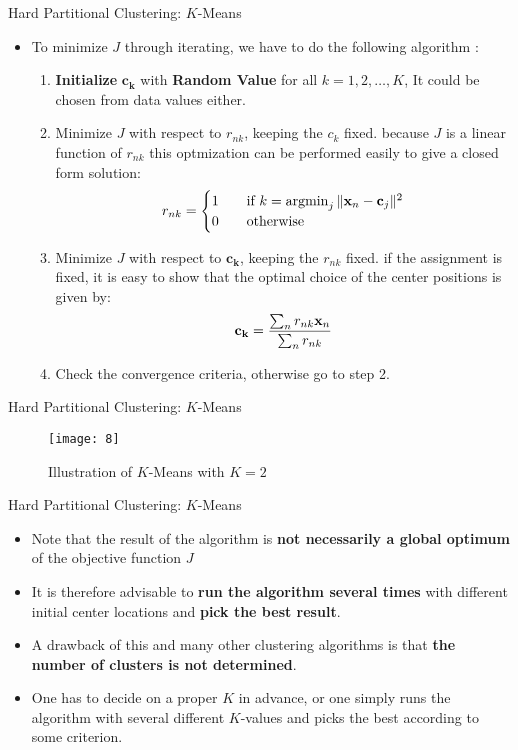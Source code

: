 \documentclass[compress,oilve]{beamer}
\DeclareMathOperator*{\argmin}{argmin}
\begin{document}
\begin{frame}{Hard Partitional Clustering: $K$-Means}
\begin{itemize}
\item To minimize $ J $ through iterating, we have to do the following algorithm :
	\begin{enumerate}
		\item \textbf{Initialize} $ \mathbf{c_{k}} $ with \textbf{Random Value} for all $ k = 1, 2, \dots, K$, It could be chosen from data values either.
		\item Minimize $ J $ with respect to $ r_{nk} $, keeping the $ c_{k} $ fixed. because $ J $ is a linear function of $ r_{nk} $ this optmization can be performed easily to give a closed form solution:
				$$ r_{nk} = \begin{cases}
    1      & \quad \text{if } k =  \argmin_{j} \| \mathbf{x_{\mathnormal n}} -  \mathbf{c_{\mathnormal j}} \| ^ {2}\\
    0  & \quad \text{otherwise}
  \end{cases} $$
		\item Minimize $ J $ with respect to $ \mathbf{c_{k}} $, keeping the $ r_{nk} $ fixed. if the assignment is fixed, it is easy to show that the optimal choice of the center positions is given by:
			$$ \mathbf{c_{k}} =  \frac{\sum_{n} r_{nk}\mathbf x_{\mathnormal n}}{\sum_{n} r_{nk}}$$
		\item Check the convergence criteria, otherwise go to step 2.	
	\end{enumerate}
\end{itemize}
\end{frame}

\begin{frame}{Hard Partitional Clustering: $K$-Means}
\begin{figure}
	\centering
	\texttt{[image: 8]}
	\caption{Illustration of $K$-Means with $K = 2$}
\end{figure}
\end{frame}

\begin{frame}{Hard Partitional Clustering: $K$-Means}
\begin{itemize}
\item Note that the result of the algorithm is \textbf{not necessarily a global optimum} of the objective function $ J $
\item It is therefore advisable to \textbf{run the algorithm several times} with different initial center locations and \textbf{pick the best result}.
\item A drawback of this and many other clustering algorithms is that \textbf{the number of clusters is not determined}.
\item One has to decide on a proper $K$ in advance, or one simply runs the algorithm with several different $K$-values and picks the best according to some criterion.
\end{itemize}
\end{frame}
\end{document}
